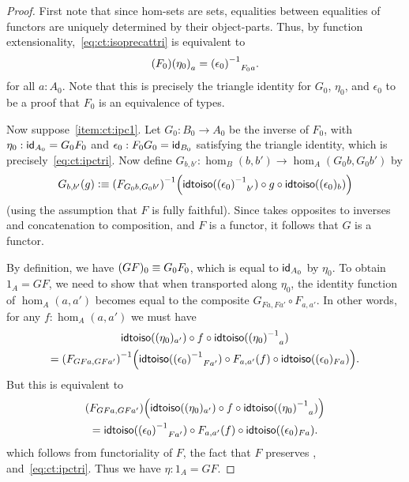\begin{proof}
  First note that since hom-sets are sets, equalities between equalities of functors are uniquely determined by their object-parts.
  Thus, by function extensionality,~\eqref{eq:ct:isoprecattri} is equivalent to
  \begin{equation}
    \map{(F_0)}{\eta_0}_a = \opp{(\epsilon_0)}_{F_0 a}.\label{eq:ct:ipctri}
  \end{equation}
  for all $a:A_0$.
  Note that this is precisely the triangle identity for $G_0$, $\eta_0$, and $\epsilon_0$ to be a proof that $F_0$ is an equivalence of types.

  Now suppose~\ref{item:ct:ipc1}.
  Let $G_0:B_0 \to A_0$ be the inverse of $F_0$, with $\eta_0: \idfunc[A_0] = G_0 F_0$ and $\epsilon_0:F_0G_0 = \idfunc[B_0]$ satisfying the triangle identity, which is precisely~\eqref{eq:ct:ipctri}.
  Now define $G_{b,b'}:\hom_B(b,b') \to \hom_A(G_0b,G_0b')$ by
  \[ G_{b,b'}(g) \defeq
  \inv{(F_{G_0b,G_0b'})}\Big(\idtoiso(\opp{(\epsilon_0)}_{b'}) \circ g \circ \idtoiso((\epsilon_0)_b)\Big)
  \]
  (using the assumption that $F$ is fully faithful).
  Since \idtoiso takes opposites to inverses and concatenation to composition, and $F$ is a functor, it follows that $G$ is a functor.

  By definition, we have $(GF)_0 \jdeq G_0 F_0$, which is equal to $\idfunc[A_0]$ by $\eta_0$.
  To obtain $1_A = GF$, we need to show that when transported along $\eta_0$, the identity function of $\hom_A(a,a')$ becomes equal to the composite $G_{Fa,Fa'} \circ F_{a,a'}$.
  In other words, for any $f:\hom_A(a,a')$ we must have
  \begin{multline*}
    \idtoiso((\eta_0)_{a'}) \circ f \circ \idtoiso(\opp{(\eta_0)}_a)\\
    = \inv{(F_{GFa,GFa'})}\Big(\idtoiso(\opp{(\epsilon_0)}_{Fa'})
    \circ F_{a,a'}(f) \circ \idtoiso((\epsilon_0)_{Fa})\Big).
  \end{multline*}
  But this is equivalent to
  \begin{multline*}
    (F_{GFa,GFa'})\Big(\idtoiso((\eta_0)_{a'}) \circ f \circ \idtoiso(\opp{(\eta_0)}_a)\Big)\\
    = \idtoiso(\opp{(\epsilon_0)}_{Fa'})
    \circ F_{a,a'}(f) \circ \idtoiso((\epsilon_0)_{Fa}).
  \end{multline*}
  which follows from functoriality of $F$, the fact that $F$ preserves \idtoiso, and~\eqref{eq:ct:ipctri}.
  Thus we have $\eta:1_A = GF$.


\end{proof}
